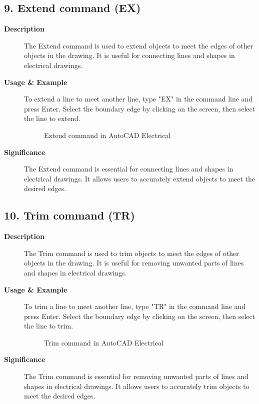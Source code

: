 \documentclass[12pt]{article}
\begin{document}
\subsection*{9. Extend command (EX)}
\begin{description}
    \item [\textbf{Description}] The Extend command is used to extend objects to meet the edges of other objects in the drawing. It is useful for connecting lines and shapes in electrical drawings.
    \item [\textbf{Usage \& Example}] To extend a line to meet another line, type "EX" in the command line and press Enter. Select the boundary edge by clicking on the screen, then select the line to extend.
          \begin{figure}[H]
              \centering
              \caption{Extend command in AutoCAD Electrical}
          \end{figure}
    \item [\textbf{Significance}] The Extend command is essential for connecting lines and shapes in electrical drawings. It allows users to accurately extend objects to meet the desired edges.
\end{description}

\subsection*{10. Trim command (TR)}
\begin{description}
    \item [\textbf{Description}] The Trim command is used to trim objects to meet the edges of other objects in the drawing. It is useful for removing unwanted parts of lines and shapes in electrical drawings.
    \item [\textbf{Usage \& Example}] To trim a line to meet another line, type "TR" in the command line and press Enter. Select the boundary edge by clicking on the screen, then select the line to trim.
          \begin{figure}[H]
              \centering
              \caption{Trim command in AutoCAD Electrical}
          \end{figure}
    \item [\textbf{Significance}] The Trim command is essential for removing unwanted parts of lines and shapes in electrical drawings. It allows users to accurately trim objects to meet the desired edges.
\end{description}
\end{document}
